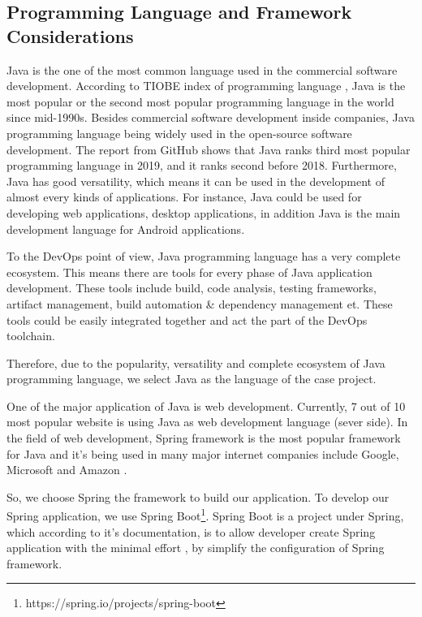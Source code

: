 \subsection{Programming Language and Framework Considerations}
Java is the one of the most common language used in the commercial software development. According to TIOBE index of programming language \cite{indexTIO42:online}, Java is the most popular or the second most popular programming language in the world since mid-1990s. Besides commercial software development inside companies, Java programming language being widely used in the open-source software development. The report \cite{TheState3:online} from GitHub shows that Java ranks third most popular programming language in 2019, and it ranks second before 2018. Furthermore, Java has good versatility, which means it can be used in the development of almost every kinds of applications. For instance, Java could be used for developing web applications, desktop applications, in addition Java is the main development language for Android applications.
\par
To the DevOps point of view, Java programming language has a very complete ecosystem. This means there are tools for every phase of Java application development. These tools include build, code analysis, testing frameworks, artifact management, build automation \& dependency management et. These tools could be easily integrated together and act the part of the DevOps toolchain.
\par
Therefore, due to the popularity, versatility and complete ecosystem of Java programming language, we select Java as the language of the case project.
\par
One of the major application of Java is web development. Currently, 7 out of 10 \cite{Programm17:online} most popular website is using Java as web development language (sever side). In the field of web development, Spring framework is the most popular framework for Java and it's being used in many major internet companies include Google, Microsoft and Amazon \cite{SpringWh14:online}. 
\par
So, we choose Spring the framework to build our application. To develop our Spring application, we use Spring Boot\footnote{https://spring.io/projects/spring-boot}. Spring Boot is a project under Spring, which according to it's documentation, is to allow developer create Spring application with the minimal effort \cite{SpringBo84:online}, by simplify the configuration of Spring framework. 
